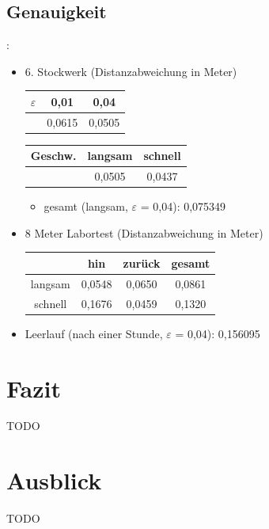 \documentclass{beamer}
\begin{document}
\subsection{Genauigkeit}
\begin{frame}{\secname: \subsecname}
\begin{itemize}
\item{6. Stockwerk (Distanzabweichung in Meter)}
\begin{center}
\begin{tabular}{ccc}
\toprule
$\varepsilon$ & 0,01 & 0,04 \\ 
\midrule
& 0,0615 & 0,0505 \\  
\bottomrule
\end{tabular}
\end{center}
\begin{center}
\begin{tabular}{ccc}
\toprule
Geschw. & langsam & schnell \\ 
\midrule
& 0,0505 & 0,0437 \\  
\bottomrule
\end{tabular}
\end{center}
\begin{itemize}
\item{gesamt (langsam, $\varepsilon$ = 0,04): 0,075349}
\end{itemize}
\item{8 Meter Labortest (Distanzabweichung in Meter)}
\begin{center}
\begin{tabular}{cccc}
\toprule
& hin & zurück & gesamt \\ 
\midrule
langsam & 0,0548 & 0,0650 & 0,0861 \\  
schnell & 0,1676 & 0,0459 & 0,1320 \\
\bottomrule
\end{tabular}
\end{center}
\item{Leerlauf (nach einer Stunde, $\varepsilon$ = 0,04): 0,156095}
\end{itemize}
\end{frame}

\section{Fazit}
\begin{frame}{\secname}
TODO    
\end{frame}

\section{Ausblick}
\begin{frame}{\secname}
TODO
\end{frame}
\end{document}
